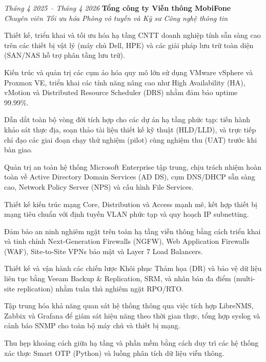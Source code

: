 \begin{twocolentry}{\textit{Tháng 4 2025 -- Tháng 4 2026}}
    \textbf{Tổng công ty Viễn thông MobiFone} \\[4pt]
    \textit{Chuyên viên Tối ưu hóa Phòng vô tuyến và Kỹ sư Công nghệ thông tin}
\end{twocolentry}
\begin{onecolentry}
    \begin{highlights}
        \item Thiết kế, triển khai và tối ưu hóa hạ tầng CNTT doanh nghiệp tính sẵn sàng cao trên các thiết bị vật lý (máy chủ Dell, HPE) và các giải pháp lưu trữ toàn diện (SAN/NAS hỗ trợ phân tầng lưu trữ).
        \item Kiến trúc và quản trị các cụm ảo hóa quy mô lớn sử dụng VMware vSphere và Proxmox VE, triển khai các tính năng nâng cao như High Availability (HA), vMotion và Distributed Resource Scheduler (DRS) nhằm đảm bảo uptime 99.99\%.
        \item Dẫn dắt toàn bộ vòng đời tích hợp cho các dự án hạ tầng phức tạp: tiến hành khảo sát thực địa, soạn thảo tài liệu thiết kế kỹ thuật (HLD/LLD), và trực tiếp chỉ đạo các giai đoạn chạy thử nghiệm (pilot) cùng nghiệm thu (UAT) trước khi bàn giao.
        \item Quản trị an toàn hệ thống Microsoft Enterprise tập trung, chịu trách nhiệm hoàn toàn về Active Directory Domain Services (AD DS), cụm DNS/DHCP sẵn sàng cao, Network Policy Server (NPS) và cấu hình File Services.
        \item Thiết kế kiến trúc mạng Core, Distribution và Access mạnh mẽ, kết hợp thiết bị mạng tiêu chuẩn với định tuyến VLAN phức tạp và quy hoạch IP subnetting.
        \item Đảm bảo an ninh nghiêm ngặt trên toàn hạ tầng viễn thông bằng cách triển khai và tinh chỉnh Next-Generation Firewalls (NGFW), Web Application Firewalls (WAF), Site-to-Site VPNs bảo mật và Layer 7 Load Balancers.
        \item Thiết kế và vận hành các chiến lược Khôi phục Thảm họa (DR) và bảo vệ dữ liệu liên tục bằng Veeam Backup \& Replication, SRM, và nhân bản đa điểm (multi-site replication) nhằm tuân thủ nghiêm ngặt RPO/RTO.
        \item Tập trung hóa khả năng quan sát hệ thống thông qua việc tích hợp LibreNMS, Zabbix và Grafana để giám sát hiệu năng theo thời gian thực, tổng hợp syslog và cảnh báo SNMP cho toàn bộ máy chủ và thiết bị mạng.
        \item Thu hẹp khoảng cách giữa hạ tầng và phần mềm bằng cách duy trì các hệ thống xác thực Smart OTP (Python) và luồng phân tích dữ liệu viễn thông.
    \end{highlights}
\end{onecolentry}
\vspace{0.2 cm}

